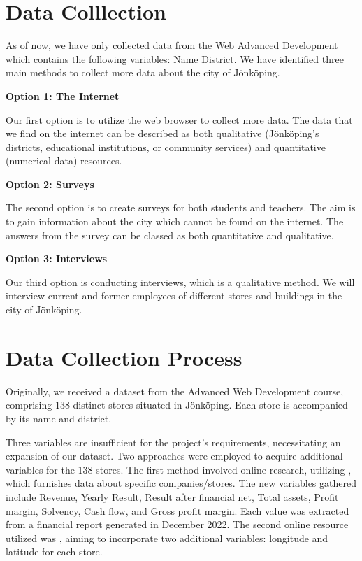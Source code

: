 \section{Data Colllection} \label{sec:DataCollection}

As of now, we have only collected data from the Web Advanced Development which contains the following variables: Name District. We have identified three main methods to collect more data about the city of Jönköping.

\textbf{Option 1: The Internet }


Our first option is to utilize the web browser to collect more data. The data that we find on the internet can be described as both qualitative (Jönköping's districts, educational institutions, or community services) and quantitative (numerical data) resources.


\textbf{Option 2: Surveys}


The second option is to create surveys for both students and teachers. The aim is to gain information about the city which cannot be found on the internet. The answers from the survey can be classed as both quantitative and qualitative. 

\textbf{Option 3: Interviews}


Our third option is conducting interviews, which is a qualitative method. We will interview current and former employees of different stores and buildings in the city of Jönköping.
 
\section{Data Collection Process}

Originally, we received a dataset from the Advanced Web Development course, comprising 138 distinct stores situated in Jönköping. Each store is accompanied by its name and district.

\vspace{6pt} 

Three variables are insufficient for the project's requirements, necessitating an expansion of our dataset. Two approaches were employed to acquire additional variables for the 138 stores. The first method involved online research, utilizing \cite{NotavailableAllaBolag}, which furnishes data about specific companies/stores. The new variables gathered include Revenue, Yearly Result, Result after financial net, Total assets, Profit margin, Solvency, Cash flow, and Gross profit margin. Each value was extracted from a financial report generated in December 2022. The second online resource utilized was \cite{NotavailableGoogleMaps}, aiming to incorporate two additional variables: longitude and latitude for each store. 
\vspace{6pt} 

